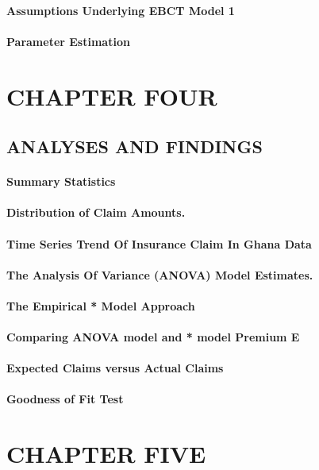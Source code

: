 \documentclass[10pt]{report}
\begin{document}
\begin{flushleft}
		\subsubsection{Assumptions Underlying EBCT Model 1}
		\subsubsection{Parameter Estimation}
		\chapter{CHAPTER  FOUR}
		\section{ANALYSES AND FINDINGS}
		\subsubsection{Summary Statistics}
		\subsubsection{Distribution of Claim Amounts.}
		\subsubsection{Time Series Trend Of Insurance  Claim In  Ghana Data}
		\subsubsection{The Analysis Of Variance (ANOVA) Model Estimates.}
		\subsubsection{The Empirical * Model Approach}
		\subsubsection{Comparing ANOVA model and * model Premium E}
		\subsubsection{Expected Claims versus Actual Claims}
		\subsubsection{Goodness of Fit Test}
		\chapter{CHAPTER  FIVE}

\end{flushleft}
\end{document}
